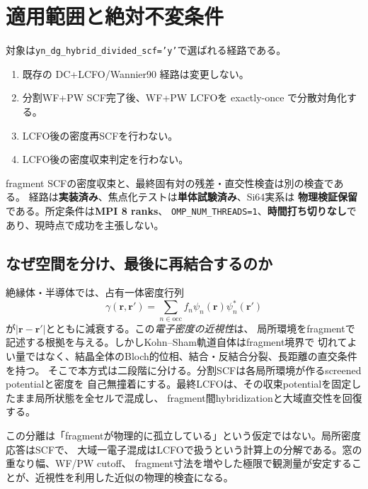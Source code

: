 \documentclass[11pt,a4paper]{article}
\newcommand{\code}[1]{\texttt{#1}}
\begin{document}
\section{適用範囲と絶対不変条件}
対象は\code{yn\_dg\_hybrid\_divided\_scf='y'}で選ばれる経路である。
\begin{enumerate}
\item 既存の DC+LCFO/Wannier90 経路は変更しない。
\item 分割WF+PW SCF完了後、WF+PW LCFOを exactly-once で分散対角化する。
\item LCFO後の密度再SCFを行わない。
\item LCFO後の密度収束判定を行わない。
\end{enumerate}
fragment SCFの密度収束と、最終固有対の残差・直交性検査は別の検査である。
経路は\textbf{実装済み}、焦点化テストは\textbf{単体試験済み}、Si64実系は
\textbf{物理検証保留}である。所定条件は\textbf{MPI 8 ranks}、
\code{OMP\_NUM\_THREADS=1}、\textbf{時間打ち切りなし}であり、現時点で成功を主張しない。

\subsection{なぜ空間を分け、最後に再結合するのか}
絶縁体・半導体では、占有一体密度行列
\begin{equation}
 \gamma(\boldsymbol r,\boldsymbol r')=
 \sum_{n\in\mathrm{occ}} f_n\psi_n(\boldsymbol r)\psi_n^*(\boldsymbol r')
\end{equation}
が$|\boldsymbol r-\boldsymbol r'|$とともに減衰する。この\emph{電子密度の近視性}は、
局所環境をfragmentで記述する根拠を与える。しかしKohn--Sham軌道自体はfragment境界で
切れてよい量ではなく、結晶全体のBloch的位相、結合・反結合分裂、長距離の直交条件を持つ。
そこで本方式は二段階に分ける。分割SCFは各局所環境が作るscreened potentialと密度を
自己無撞着にする。最終LCFOは、その収束potentialを固定したまま局所状態を全セルで混成し、
fragment間hybridizationと大域直交性を回復する。

この分離は「fragmentが物理的に孤立している」という仮定ではない。局所密度応答はSCFで、
大域一電子混成はLCFOで扱うという計算上の分解である。窓の重なり幅、WF/PW cutoff、
fragment寸法を増やした極限で観測量が安定することが、近視性を利用した近似の物理的検査になる。
\end{document}
